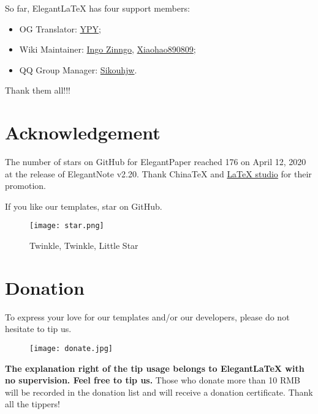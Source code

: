 \documentclass[en,hazy,screen,blue,14pt]{elegantnote}
\begin{document}
So far, Elegant\LaTeX{} has four support members:
\begin{itemize}
	\item OG Translator: \href{https://github.com/peggy2006xzyz}{YPY};
	\item Wiki Maintainer: \href{https://github.com/izinngo}{Ingo Zinngo}, \href{https://github.com/xiaohao890809}{Xiaohao890809};
	\item QQ Group Manager: \href{https://github.com/sikouhjw}{Sikouhjw}.
\end{itemize}

Thank them all!!!

\section{Acknowledgement}
The number of stars on GitHub for ElegantPaper reached 176 on April 12, 2020 at the release of ElegantNote v2.20.
Thank China\TeX{} and \href{http://www.latexstudio.net/}{\LaTeX{} studio} for their promotion. 

If you like our templates, star on GitHub.
\begin{figure}[!ht]
	\centering
	\texttt{[image: star.png]}
	\caption{Twinkle, Twinkle, Little Star}
\end{figure}

\section{Donation}
To express your love for our templates and/or our developers, please do not hesitate to tip us.
\begin{figure}[!htbp]
	\centering
	\texttt{[image: donate.jpg]}
\end{figure}

\textbf{The explanation right of the tip usage belongs to Elegant\LaTeX{} with no supervision. Feel free to tip us.} Those who donate more than 10 RMB will be recorded in the donation list and will receive a donation certificate. Thank all the tippers!
\end{document}
